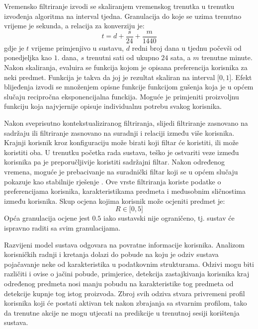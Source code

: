 \documentclass[times, utf8, diplomski, numeric]{fer}
\begin{document}
Vremensko filtriranje izvodi se skaliranjem vremenskog trenutka u trenutku
izvođenja algoritma na interval tjedna. Granulacija do koje se uzima trenutno
vrijeme je sekunda, a relacija za konverziju je:
\begin{equation}
\label{eq:timeconv}
	t = d + \frac{s}{24} + \frac{m}{1440}
\end{equation}
gdje je $t$ vrijeme primjenjivo u sustavu, $d$ redni broj dana u tjednu počevši
od ponedjeljka kao $1$. dana, $s$ trenutni sati od ukupno $24$ sata, a $m$
trenutne minute. Nakon skaliranja, evaluira se funkcija kojom je opisana
preferencija korisnika za neki predmet. Funkcija je takva da joj je rezultat
skaliran na interval $\big[0, 1\big]$. Efekt blijeđenja  izvodi
se množenjem opisne funkcije funkcijom gušenja koja je u općem slučaju
recipročna eksponencijalna funckija. Moguće je primjeniti proizvoljnu funkciju
koja najvjernije opisuje individualnu potrebu svakog korisnika.

Nakon sveprisutno kontekstualiziranog filtriranja, slijedi filtriranje zasnovano
na sadržaju ili filtriranje zasnovano na suradnji i relaciji između više
korisnika. Krajnji korisnik kroz konfiguraciju može birati koji filtar će
koristiti, ili može koristiti oba. U trenutku početka rada sustava, teško je
ostvariti veze između korisnika pa je preporučljivije koristiti sadržajni
filtar. Nakon određenog vremena, moguće je prebacivanje na suradnički filtar
koji se u općem slučaju pokazuje kao stabilnije rješenje \cite{RSHandbook}.
Ove vrste filtriranja koriste podatke o preferencijama korisnika,
karakteristikama predmeta i međusobnim sličnostima između korisnika. Skup ocjena
kojima korisnik može ocjeniti predmet je:
\begin{equation}
	\label{eq:ratings}
	R \in \big[0,5\big]
\end{equation}
Opća granulacija ocjene jest $0.5$ iako sustavski nije ograničeno, tj. sustav
će ispravno raditi sa svim granulacijama.

Razvijeni model sustava odgovara na povratne informacije korisnika. Analizom
korisničkih radnji i kretanja dolazi do pobude na koju je odziv sustava
pojačavanje neke od karakteristika u podatkovnim strukturama. Odzivi mogu biti
različiti i ovise o jačini pobude, primjerice, detekcija zastajkivanja korisnika
kraj određenog predmeta nosi manju pobudu na karakteristike tog predmeta od
detekcije kupnje tog istog proizvoda. Zbroj svih odziva stvara privremeni profil
korisnika koji će postati aktivan tek nakon zbrajanja sa stvarnim profilom, tako
da trenutne akcije ne mogu utjecati na predikcije u trenutnoj sesiji korištenja
sustava.
\end{document}
